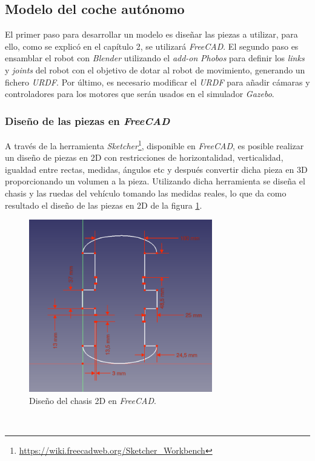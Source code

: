 \subsection{Modelo del coche autónomo}
\label{subsection:vehiclemodel}
El primer paso para desarrollar un modelo es diseñar las piezas a utilizar, para ello, como se explicó en el capítulo 2, se utilizará \textit{FreeCAD}. El segundo paso es
ensamblar el robot con \textit{Blender} utilizando el \textit{add-on} \textit{Phobos} para definir los \textit{links} y \textit{joints} del robot con el objetivo de dotar al robot
de movimiento, generando un fichero \textit{URDF}. Por último, es necesario modificar el \textit{URDF} para añadir cámaras y controladores para los motores que serán usados en el
simulador \textit{Gazebo}.\\

\subsubsection{Diseño de las piezas en \textit{FreeCAD}}

A través de la herramienta \textit{Sketcher}\footnote{\url{https://wiki.freecadweb.org/Sketcher_Workbench}}, disponible en \textit{FreeCAD}, es posible realizar un diseño de
piezas en 2D con restricciones de horizontalidad, verticalidad, igualdad entre rectas, medidas, ángulos etc y después convertir dicha pieza en 3D proporcionando un volumen a la
pieza. Utilizando dicha herramienta se diseña el chasis y las ruedas del vehículo tomando las medidas reales, lo que da como resultado el diseño de las piezas en 2D de la figura
\ref{fig:design2Dfreecad}.\\

\begin{figure} [h!]
	\begin{center}
		\includegraphics[width=8cm]{figs/sketchFreecad}
	\end{center}
	\caption{Diseño del chasis 2D en \textit{FreeCAD}.}
	\label{fig:design2Dfreecad}
\end{figure}\

